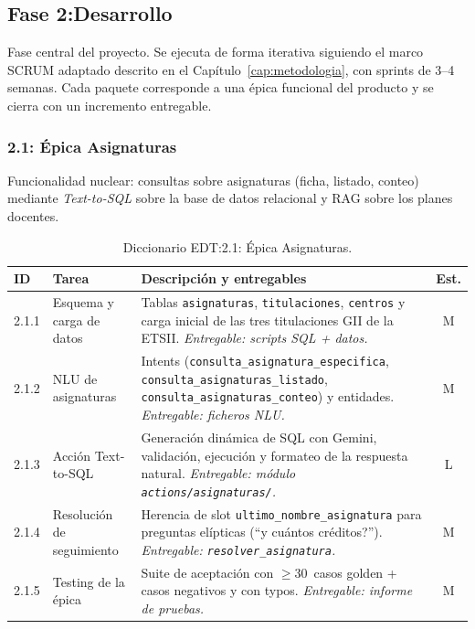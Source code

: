 \subsection{Fase 2:Desarrollo}\label{subsec:fase-desarrollo}

Fase central del proyecto. Se ejecuta de forma iterativa siguiendo el marco SCRUM adaptado descrito en el Capítulo~\ref{cap:metodologia}, con sprints de 3--4 semanas. Cada paquete corresponde a una épica funcional del producto y se cierra con un incremento entregable.

\subsubsection{2.1: Épica Asignaturas}\label{subsubsec:epica-asig}

Funcionalidad nuclear: consultas sobre asignaturas (ficha, listado, conteo) mediante \textit{Text-to-SQL} sobre la base de datos relacional y RAG sobre los planes docentes.

\begin{table}[hbtp]
\centering
\small
\begin{tabular}{|l|l|p{7.5cm}|c|}
\hline
\textbf{ID} & \textbf{Tarea} & \textbf{Descripción y entregables} & \textbf{Est.} \\ \hline
2.1.1 & Esquema y carga de datos & Tablas \texttt{asignaturas}, \texttt{titulaciones}, \texttt{centros} y carga inicial de las tres titulaciones GII de la ETSII. \textit{Entregable: scripts SQL + datos.} & M \\ \hline
2.1.2 & NLU de asignaturas & Intents (\texttt{consulta\_asignatura\_especifica}, \texttt{consulta\_asignaturas\_listado}, \texttt{consulta\_asignaturas\_conteo}) y entidades. \textit{Entregable: ficheros NLU.} & M \\ \hline
2.1.3 & Acción Text-to-SQL & Generación dinámica de SQL con Gemini, validación, ejecución y formateo de la respuesta natural. \textit{Entregable: módulo \texttt{actions/asignaturas/}.} & L \\ \hline
2.1.4 & Resolución de seguimiento & Herencia de slot \texttt{ultimo\_nombre\_asignatura} para preguntas elípticas (``y cuántos créditos?''). \textit{Entregable: \texttt{resolver\_asignatura}.} & M \\ \hline
2.1.5 & Testing de la épica & Suite de aceptación con $\geq$30~casos golden + casos negativos y con typos. \textit{Entregable: informe de pruebas.} & M \\ \hline
\end{tabular}
\caption{Diccionario EDT:2.1: Épica Asignaturas.}
\label{tab:dict-2-1}
\end{table}

